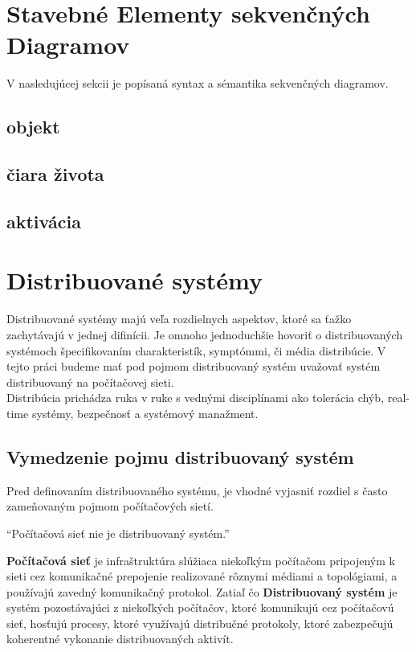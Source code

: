 \section{Stavebné Elementy sekvenčných Diagramov}

V nasledujúcej sekcii je popísaná syntax a sémantika sekvenčných diagramov.

\subsection{objekt}

\subsection{čiara života}

\subsection{aktivácia}

\section{Distribuované systémy}

Distribuované systémy majú veľa rozdielnych aspektov, ktoré sa ťažko zachytávajú v jednej difinícii. Je omnoho jednoduchšie hovoriť o distribuovaných systémoch špecifikovaním charakteristík, symptómmi, či média distribúcie. \cite{} V tejto práci budeme mať pod pojmom distribuovaný systém uvažovať systém distribuovaný na počítačovej sieti. \\

Distribúcia prichádza ruka v ruke s vednými disciplínami ako tolerácia chýb, real-time systémy, bezpečnosť a systémový manažment.

\subsection{Vymedzenie pojmu distribuovaný systém}

Pred definovaním distribuovaného systému, je vhodné vyjasniť rozdiel s často zameňovaným pojmom počítačových sietí.

\begin{displayquote}
	``Počítačová sieť nie je distribuovaný systém.''
\end{displayquote}

\textbf{Počítačová sieť} je infraštruktúra slúžiaca niekoľkým počítačom  pripojeným k sieti cez komunikačné prepojenie realizované rôznymi médiami a topológiami, a používajú zavedný komunikačný protokol.
Zatiaľ čo \textbf{Distribuovaný systém} je systém pozostávajúci z niekoľkých počítačov, ktoré komunikujú cez počítačovú sieť, hosťujú procesy, ktoré využívajú distribučné protokoly, ktoré zabezpečujú koherentné vykonanie distribuovaných aktivít. \\

